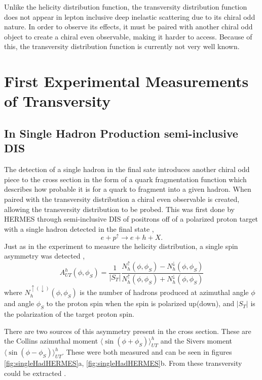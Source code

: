 \documentclass[abstract = on,listof=totoc, bibliography=totoc]{scrreprt}
\begin{document}
Unlike the helicity distribution function, the transversity distribution function does not appear in lepton inclusive deep inelastic scattering due to its chiral odd nature. In order to observe its effects, it must be paired with another chiral odd object to create a chiral even observable, making it harder to access. Because of this, the transversity distribution function is currently not very well known.

\section{First Experimental Measurements of Transversity}
\subsection{In Single Hadron Production semi-inclusive DIS}
The detection of a single hadron in the final sate introduces another chiral odd piece to the cross section in the form of a quark fragmentation function which describes how probable it is for a quark to fragment into a given hadron. When paired with the transversity distribution a chiral even observable is created, allowing the transversity distribution to be probed. This was first done by HERMES through semi-inclusive DIS of positrons off of a polarized proton target with a single hadron detected in the final state \cite{Airapetian:2004tw, Anselmino:2007fs}, 
\begin{equation}
e+p^\uparrow \rightarrow e + h + X.
\end{equation}
Just as in the experiment to measure the helicity distribution, a single spin asymmetry was detected \cite{Airapetian:2004tw},
\begin{equation}
A^h_{UT}(\phi,\phi_S) = \frac{1}{|S_T|}\frac{N^\uparrow_h(\phi,\phi_S) - N^\downarrow_h(\phi,\phi_S)}{N^\uparrow_h(\phi,\phi_S) + N^\downarrow_h(\phi,\phi_S)}
\end{equation} 
where $N^{\uparrow(\downarrow)}_h(\phi,\phi_S)$ is the number of hadrons produced at azimuthal angle $\phi$ and angle $\phi_S$ to the proton spin when the spin is polarized up(down), and $|S_T|$ is the polarization of the target proton spin. 

There are two sources of this asymmetry present in the cross section. These are the Collins azimuthal moment $\langle\sin(\phi+\phi_S)\rangle_{UT}^h$ and the Sivers moment $\langle\sin(\phi-\phi_S)\rangle_{UT}^h$. These were both measured and can be seen in figures \ref{fig:singleHadHERMES}a, \ref{fig:singleHadHERMES}b. From these transversity could be extracted \cite{Anselmino:2007fs}.
\end{document}
